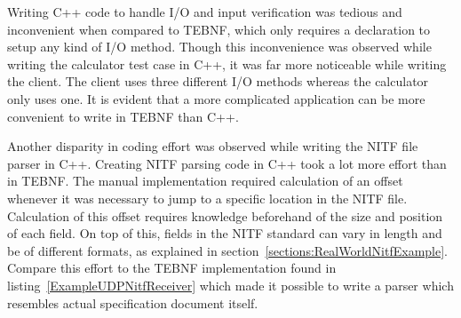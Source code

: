 \indent
Writing C++ code to handle I/O and input verification was tedious and inconvenient when compared to TEBNF, which only requires a declaration to setup any kind of I/O method.  Though this inconvenience was observed while writing the calculator test case in C++, it was far more noticeable while writing the client.  The client uses three different I/O methods whereas the calculator only uses one.  It is evident that a more complicated application can be more convenient to write in TEBNF than C++.

\indent
Another disparity in coding effort was observed while writing the NITF file parser in C++.  Creating NITF parsing code in C++ took a lot more effort than in TEBNF.  The manual implementation required calculation of an offset whenever it was necessary to jump to a specific location in the NITF file.  Calculation of this offset requires knowledge beforehand of the size and position of each field.  On top of this, fields in the NITF standard can vary in length and be of different formats, as explained in section~\ref{sections:RealWorldNitfExample}.  Compare this effort to the TEBNF implementation found in listing~\ref{ExampleUDPNitfReceiver} which made it possible to write a parser which resembles actual specification document itself.
